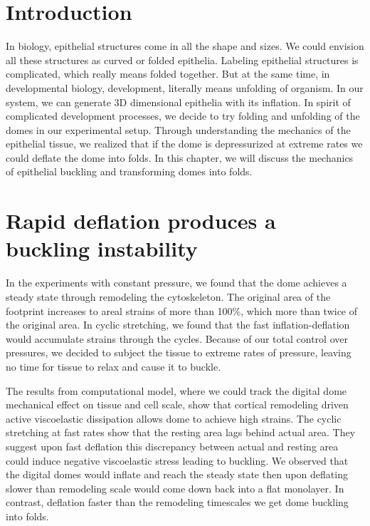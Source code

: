 \hypertarget{introduction}{%
\section{Introduction}\label{introduction5}}

In biology, epithelial structures come in all the shape and sizes. We
could envision all these structures as curved or folded epithelia.
Labeling epithelial structures is complicated, which really means folded
together. But at the same time, in developmental biology, development,
literally means unfolding of organism. In our system, we can generate 3D
dimensional epithelia with its inflation. In spirit of complicated
development processes, we decide to try folding and unfolding of the
domes in our experimental setup. Through understanding the mechanics of
the epithelial tissue, we realized that if the dome is depressurized at
extreme rates we could deflate the dome into folds. In this chapter, we
will discuss the mechanics of epithelial buckling and transforming domes
into folds.

\hypertarget{rapid-deflation-produces-a-buckling-instability}{%
\section{Rapid deflation produces a buckling
instability}\label{rapid-deflation-produces-a-buckling-instability}}

In the experiments with constant pressure, we found that the dome
achieves a steady state through remodeling the cytoskeleton. The
original area of the footprint increases to areal strains of more than
100\%, which more than twice of the original area. In cyclic stretching,
we found that the fast inflation-deflation would accumulate strains
through the cycles. Because of our total control over pressures, we
decided to subject the tissue to extreme rates of pressure, leaving no
time for tissue to relax and cause it to buckle.

The results from computational model, where we could track the digital
dome mechanical effect on tissue and cell scale, show that cortical
remodeling driven active viscoelastic dissipation allows dome to achieve
high strains. The cyclic stretching at fast rates show that the resting
area lags behind actual area. They suggest upon fast deflation this
discrepancy between actual and resting area could induce negative
viscoelastic stress leading to buckling. We observed that the digital
domes would inflate and reach the steady state then upon deflating
slower than remodeling scale would come down back into a flat monolayer.
In contrast, deflation faster than the remodeling timescales we get dome
buckling into folds.

